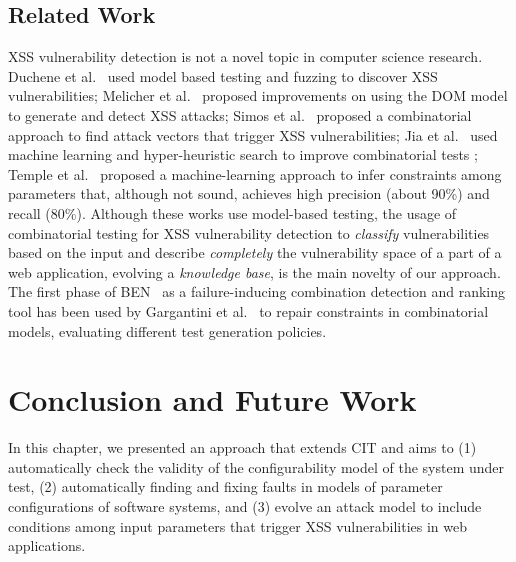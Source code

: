 \begin{tikzborder}{\cite{Gargantini16:validation}}
\begin{tikzborder}{\cite{gargantini_combinatorial_2017}}
\begin{tikzborder}{\cite{gargantini_combinatorial_2017}}
\begin{tikzborder}{\cite{garn2019}}
\subsection{Related Work}\label{sec:xssrelatedwork}
\bb XSS vulnerability detection is not a novel topic in computer science research. %
Duchene et al.~\cite{Duchene:2012} used model based testing and fuzzing to discover XSS vulnerabilities; Melicher et al.~\cite{melicher_riding_2018} proposed improvements on using the DOM model to generate
and detect
XSS attacks; %
Simos et al.~\cite{wotawa_combinatorial_2016} proposed a combinatorial approach to find attack vectors that trigger XSS vulnerabilities; Jia et al.~\cite{Jia:2015} %
used machine learning and hyper-heuristic search to improve combinatorial tests%
; Temple et al.~\cite{Temple16:using} proposed a machine-learning approach to infer constraints among parameters that, although not sound, achieves high precision (about 90\%) and recall (80\%).
Although these works use model-based testing,%
the usage of combinatorial testing for XSS vulnerability detection to \textit{classify} vulnerabilities based on the input and describe \textit{completely} the vulnerability space of a part of a web application, evolving a \textit{knowledge base}, is the main novelty of our approach.
The first phase of BEN~\cite{ghandehari2018combinatorial} as a failure-inducing combination detection and ranking tool 
has been used by Gargantini et al.~\cite{gargantini_combinatorial_2017} to repair constraints in combinatorial models, evaluating different test generation policies.
\be

\section{Conclusion and Future Work}\label{sec:conclusion-future-work}

In this chapter, we presented an approach that extends CIT and aims to (1) automatically check the validity of the configurability model of the system under test, (2) automatically finding and fixing faults in models of parameter configurations of software systems, and (3) evolve an attack model to include conditions among input parameters that trigger XSS vulnerabilities in web applications. 


\end{tikzborder}
\end{tikzborder}
\end{tikzborder}
\end{tikzborder}
